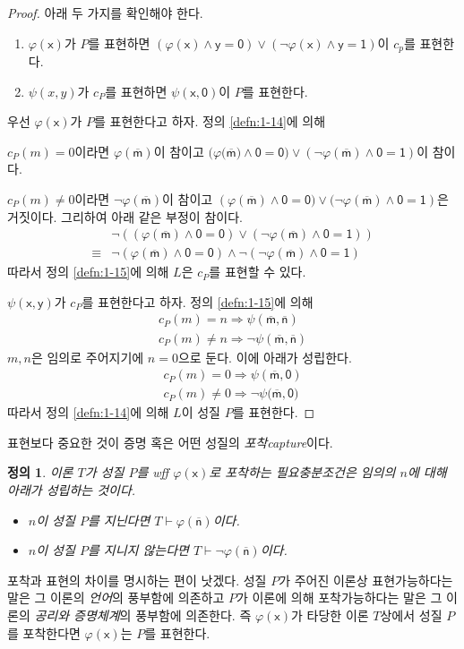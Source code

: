 \documentclass[a4paper,chapter,atbegshi]{oblivoir}
\newtheorem{defn}{정의}[chapter]
\begin{document}
\begin{proof}
  아래 두 가지를 확인해야 한다. 
  \begin{enumerate}
    \item $\varphi(\mathsf{x})$가 $P$를 표현하면 $\mathsf{(\varphi(x)\wedge y=0)
        \vee (\neg\varphi(x)\wedge y=1)}$이 $c_p$를 표현한다.
      \item $\psi(x,y)$가 $c_P$를 표현하면 $\mathsf{\psi(x,0)}$이 $P$를 표현한다.
  \end{enumerate}
  우선 $\varphi(\mathsf{x})$가 $P$를 표현한다고 하자. 정의 \ref{defn:1-14}에 의해

  $c_P(m)=0$이라면 $\varphi(\mathsf{\overline{m}})$이 참이고 
  $(\varphi(\mathsf{\overline{m})\wedge0=0)\vee
  (\neg\varphi(\overline{m})\wedge0=1)}$이 참이다.
  
  $c_P(m)\neq0$이라면 $\neg\varphi(\mathsf{\overline{m}})$이 참이고
  $(\mathsf{\varphi(\overline{m})\wedge0=0)\vee
  (\neg\varphi(\overline{m})\wedge0=1})$은 거짓이다. 그리하여 아래 같은 부정이
  참이다.
  \begin{align*}
  &\mathsf{\neg((\varphi(\overline{m})\wedge0=0)\vee(\neg\varphi(\overline{m})\wedge0=1))}\\
    \equiv&\mathsf{\neg(\varphi(\overline{m})\wedge0=0)\wedge\neg(\neg\varphi(\overline{m})\wedge0=1)}
  \end{align*}
  따라서 정의 \ref{defn:1-15}에 의해 $L$은 $c_P$를 표현할 수 있다.
  
  $\psi(\mathsf{x,y})$가 $c_P$를 표현한다고 하자. 정의 \ref{defn:1-15}에 의해
  \begin{align*}
    c_P(m)=n\Rightarrow\psi(\mathsf{\overline{m},\overline{n}}) \\
    c_P(m)\neq n\Rightarrow \neg\psi(\mathsf{\overline{m},\overline{n}})
\end{align*}
$m,n$은 임의로 주어지기에 $n=0$으로 둔다. 이에 아래가 성립한다.
\begin{align*}
  c_P(m)=0\Rightarrow\psi(\mathsf{\overline{m},0})\\
  c_P(m)\neq0\mathsf{\Rightarrow\neg\psi(\overline{m},0})
\end{align*}
따라서 정의 \ref{defn:1-14}에 의해 $L$이 성질 $P$를 표현한다.
\end{proof}
표현보다 중요한 것이 증명 혹은 어떤 성질의 \emph{포착\tiny capture}이다.
\begin{defn}
  이론 $T$가 성질 $P$를 wff $\mathsf{\varphi(x)}$로 포착하는 필요충분조건은
  임의의 $n$에 대해 아래가 성립하는 것이다.
  \begin{itemize}
    \item $n$이 성질 $P$를 지닌다면 $T\vdash\varphi(\mathsf{\overline{n}})$이다.
    \item $n$이 성질 $P$를 지니지 않는다면 $T\vdash\neg\varphi(\mathsf{\overline{n}})$이다.
  \end{itemize}
\end{defn}
포착과 표현의 차이를 명시하는 편이 낫겠다. 성질 $P$가 주어진 이론상 표현가능하다는
말은 그 이론의 \emph{언어}의 풍부함에 의존하고 $P$가 이론에 의해 포착가능하다는
말은 그 이론의 \emph{공리와 증명체계}의 풍부함에 의존한다. 즉 
$\mathsf{\varphi(x)}$가 타당한 이론 $T$상에서 성질 $P$를 포착한다면 
$\mathsf{\varphi(x)}$는 $P$를 표현한다.
\end{document}
